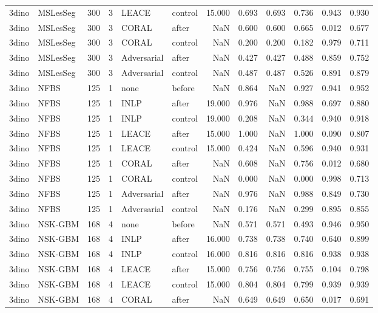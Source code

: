 \begin{tabular}{llrrllrrrrrr}
3dino & MSLesSeg & 300 & 3 & LEACE & control & 15.000 & 0.693 & 0.693 & 0.736 & 0.943 & 0.930 \\
3dino & MSLesSeg & 300 & 3 & CORAL & after & NaN & 0.600 & 0.600 & 0.665 & 0.012 & 0.677 \\
3dino & MSLesSeg & 300 & 3 & CORAL & control & NaN & 0.200 & 0.200 & 0.182 & 0.979 & 0.711 \\
3dino & MSLesSeg & 300 & 3 & Adversarial & after & NaN & 0.427 & 0.427 & 0.488 & 0.859 & 0.752 \\
3dino & MSLesSeg & 300 & 3 & Adversarial & control & NaN & 0.487 & 0.487 & 0.526 & 0.891 & 0.879 \\
3dino & NFBS & 125 & 1 & none & before & NaN & 0.864 & NaN & 0.927 & 0.941 & 0.952 \\
3dino & NFBS & 125 & 1 & INLP & after & 19.000 & 0.976 & NaN & 0.988 & 0.697 & 0.880 \\
3dino & NFBS & 125 & 1 & INLP & control & 19.000 & 0.208 & NaN & 0.344 & 0.940 & 0.918 \\
3dino & NFBS & 125 & 1 & LEACE & after & 15.000 & 1.000 & NaN & 1.000 & 0.090 & 0.807 \\
3dino & NFBS & 125 & 1 & LEACE & control & 15.000 & 0.424 & NaN & 0.596 & 0.940 & 0.931 \\
3dino & NFBS & 125 & 1 & CORAL & after & NaN & 0.608 & NaN & 0.756 & 0.012 & 0.680 \\
3dino & NFBS & 125 & 1 & CORAL & control & NaN & 0.000 & NaN & 0.000 & 0.998 & 0.713 \\
3dino & NFBS & 125 & 1 & Adversarial & after & NaN & 0.976 & NaN & 0.988 & 0.849 & 0.730 \\
3dino & NFBS & 125 & 1 & Adversarial & control & NaN & 0.176 & NaN & 0.299 & 0.895 & 0.855 \\
3dino & NSK-GBM & 168 & 4 & none & before & NaN & 0.571 & 0.571 & 0.493 & 0.946 & 0.950 \\
3dino & NSK-GBM & 168 & 4 & INLP & after & 16.000 & 0.738 & 0.738 & 0.740 & 0.640 & 0.899 \\
3dino & NSK-GBM & 168 & 4 & INLP & control & 16.000 & 0.816 & 0.816 & 0.816 & 0.938 & 0.938 \\
3dino & NSK-GBM & 168 & 4 & LEACE & after & 15.000 & 0.756 & 0.756 & 0.755 & 0.104 & 0.798 \\
3dino & NSK-GBM & 168 & 4 & LEACE & control & 15.000 & 0.804 & 0.804 & 0.799 & 0.939 & 0.939 \\
3dino & NSK-GBM & 168 & 4 & CORAL & after & NaN & 0.649 & 0.649 & 0.650 & 0.017 & 0.691 \\

\end{tabular}
